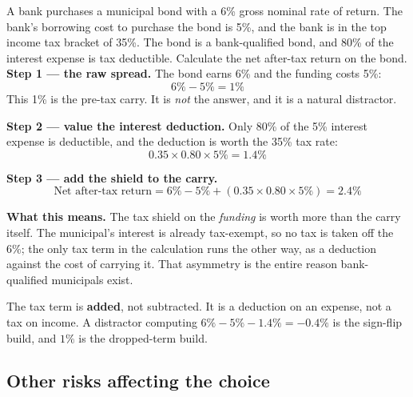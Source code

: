 \begin{lrexbox}
A bank purchases a municipal bond with a 6\% gross nominal rate of return. The bank's borrowing cost to purchase the bond is 5\%, and the bank is in the top income tax bracket of 35\%. The bond is a bank-qualified bond, and 80\% of the interest expense is tax deductible. Calculate the net after-tax return on the bond.
\tcblower
\textbf{Step 1 — the raw spread.} The bond earns 6\% and the funding costs 5\%:
\[ 6\% - 5\% = 1\% \]
This 1\% is the pre-tax carry. It is \emph{not} the answer, and it is a natural distractor.

\textbf{Step 2 — value the interest deduction.} Only 80\% of the 5\% interest expense is deductible, and the deduction is worth the 35\% tax rate:
\[ 0.35 \times 0.80 \times 5\% = 1.4\% \]

\textbf{Step 3 — add the shield to the carry.}
\[ \text{Net after-tax return} = 6\% - 5\% + (0.35 \times 0.80 \times 5\%) = \mathbf{2.4\%} \]

\textbf{What this means.} The tax shield on the \emph{funding} is worth more than the carry itself. The municipal's interest is already tax-exempt, so no tax is taken off the 6\%; the only tax term in the calculation runs the other way, as a deduction against the cost of carrying it. That asymmetry is the entire reason bank-qualified municipals exist.
\end{lrexbox}

\begin{lrtrapbox}
The tax term is \textbf{added}, not subtracted. It is a deduction on an expense, not a tax on income. A distractor computing $6\% - 5\% - 1.4\% = -0.4\%$ is the sign-flip build, and $1\%$ is the dropped-term build.
\end{lrtrapbox}

\subsection{Other risks affecting the choice}

